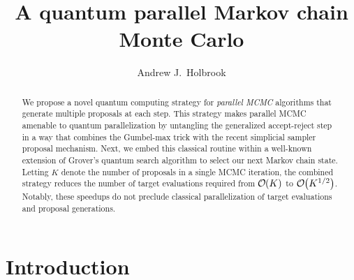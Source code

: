 \documentclass[12pt]{article} %
\title{A quantum parallel Markov chain Monte Carlo}
\date{}
\author{Andrew J.~Holbrook}
\affil{UCLA Biostatistics}
\newcommand{\order}[1]{{\cal O}\hspace{-0.2em}\left( #1 \right)}
\begin{document}
\maketitle




\begin{abstract}

We propose a novel quantum computing strategy for \emph{parallel MCMC} algorithms that generate multiple proposals at each step. This strategy makes parallel MCMC amenable to quantum parallelization by untangling the generalized accept-reject step in a way that combines the Gumbel-max trick with the recent simplicial sampler proposal mechanism.  Next, we embed this classical routine within a well-known extension of Grover's quantum search algorithm to select our next Markov chain state.  Letting $K$ denote the number of proposals in a single MCMC iteration, the combined strategy reduces the number of target evaluations required from $\order{K}$ to $\order{K^{1/2}}$.  Notably, these speedups do not preclude classical parallelization of target evaluations and proposal generations.



\end{abstract}


\section{Introduction}

\newcommand{\ttheta}{\boldsymbol{\theta}}
\newcommand{\dd}{\mbox{d}}
\newcommand{\ppsi}{\boldsymbol{\psi}}
\newcommand{\U}{\mathbf{U}}
\newcommand{\I}{\mathbf{I}}
\renewcommand{\H}{\mathbf{H}}
\newcommand{\A}{\mathbf{A}}
\newcommand{\B}{\mathbf{B}}
\end{document}
